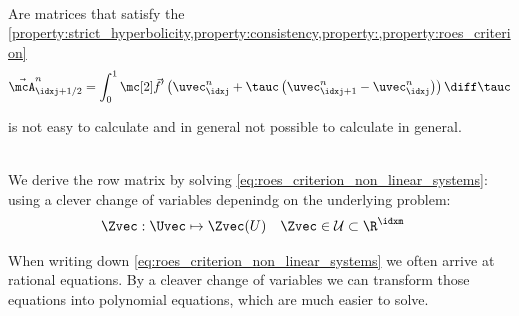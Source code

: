 \begin{defnbox}\nospacing
    \begin{defn}\label{defn:roe_matrices}\leavevmode\\
        Are matrices that satisfy the \cref{property:strict_hyperbolicity,property:consistency,property:,property:roes_criterion}
        \begin{align}
          \linfluxvec_{\idxj+1/2}^{n}=\int_{0}^{1}\fluxvec' \left(\uvec_{\idxj}^{n}+\tauc \left(\uvec_{\idxj+1}^{n}-\uvec_{\idxj}^{n}\right)\right)\diff\tauc\label{eq:roe_matrices}
        \end{align}
    \end{defn}
\end{defnbox}
\begin{sectionbox}[Problem]\nospacing
    is not easy to calculate and in general not possible to calculate in general.
\end{sectionbox}
\begin{propositionbox}\nospacing
    \begin{proposition}\leavevmode\\
        \label{proposition:roe_matrix}
        We derive the row matrix by solving \cref{eq:roes_criterion_non_linear_systems}:\\
        using a clever change of variables depenindg on the underlying problem:
        \begin{align}
          &\Zvec:\Uvec\mapsto\Zvec(U)&&\Zvec\in\admissibleset\subset\R^{\idxm}
        \end{align}
    \end{proposition}
\end{propositionbox}
\begin{explanationbox}\nospacing
    \begin{explanation}
        When writing down \cref{eq:roes_criterion_non_linear_systems} we often arrive at rational equations.
        By a cleaver change of variables we can transform those equations into polynomial equations, which are much easier to solve.
    \end{explanation}
\end{explanationbox}

